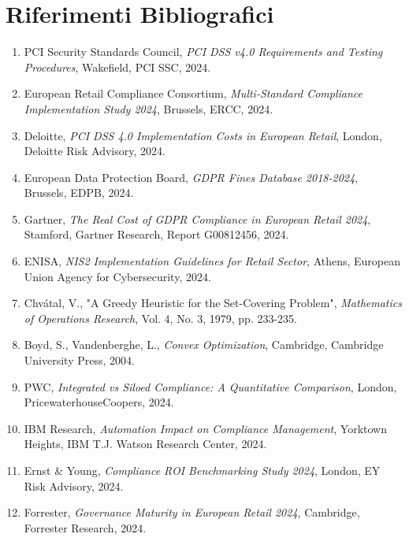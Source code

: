 \section*{Riferimenti Bibliografici}

\begin{enumerate}
\item PCI Security Standards Council, \textit{PCI DSS v4.0 Requirements and Testing Procedures}, Wakefield, PCI SSC, 2024.

\item European Retail Compliance Consortium, \textit{Multi-Standard Compliance Implementation Study 2024}, Brussels, ERCC, 2024.

\item Deloitte, \textit{PCI DSS 4.0 Implementation Costs in European Retail}, London, Deloitte Risk Advisory, 2024.

\item European Data Protection Board, \textit{GDPR Fines Database 2018-2024}, Brussels, EDPB, 2024.

\item Gartner, \textit{The Real Cost of GDPR Compliance in European Retail 2024}, Stamford, Gartner Research, Report G00812456, 2024.

\item ENISA, \textit{NIS2 Implementation Guidelines for Retail Sector}, Athens, European Union Agency for Cybersecurity, 2024.

\item Chvátal, V., "A Greedy Heuristic for the Set-Covering Problem", \textit{Mathematics of Operations Research}, Vol. 4, No. 3, 1979, pp. 233-235.

\item Boyd, S., Vandenberghe, L., \textit{Convex Optimization}, Cambridge, Cambridge University Press, 2004.

\item PWC, \textit{Integrated vs Siloed Compliance: A Quantitative Comparison}, London, PricewaterhouseCoopers, 2024.

\item IBM Research, \textit{Automation Impact on Compliance Management}, Yorktown Heights, IBM T.J. Watson Research Center, 2024.

\item Ernst \& Young, \textit{Compliance ROI Benchmarking Study 2024}, London, EY Risk Advisory, 2024.

\item Forrester, \textit{Governance Maturity in European Retail 2024}, Cambridge, Forrester Research, 2024.


\end{enumerate}
